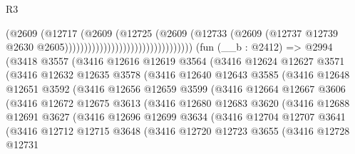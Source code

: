 \begin{lexlean}{R3}
\begin{coremodule}
                                                      (@2609
                                                        (@12717
                                                          (@2609
                                                            (@12725
                                                              (@2609
                                                                (@12733
                                                                  (@2609
                                                                    (@12737
                                                                      @12739
                                                                      @2630
                                                                      @2605)))))))))))))))))))))))))))))))))
    (fun (__b : @2412) =>
    @2994
      (@3418
        @3557
        (@3416
          @12616
          @12619
          @3564
          (@3416
            @12624
            @12627
            @3571
            (@3416
              @12632
              @12635
              @3578
              (@3416
                @12640
                @12643
                @3585
                (@3416
                  @12648
                  @12651
                  @3592
                  (@3416
                    @12656
                    @12659
                    @3599
                    (@3416
                      @12664
                      @12667
                      @3606
                      (@3416
                        @12672
                        @12675
                        @3613
                        (@3416
                          @12680
                          @12683
                          @3620
                          (@3416
                            @12688
                            @12691
                            @3627
                            (@3416
                              @12696
                              @12699
                              @3634
                              (@3416
                                @12704
                                @12707
                                @3641
                                (@3416
                                  @12712
                                  @12715
                                  @3648
                                  (@3416
                                    @12720
                                    @12723
                                    @3655
                                    (@3416
                                      @12728
                                      @12731

\end{coremodule}
\end{lexlean}
